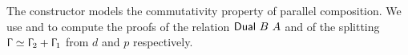 \begin{AgdaAlign}
The constructor  models the commutativity
property of parallel composition. We use  and
 to compute the proofs of the relation
$\AgdaDatatype{Dual}~B~A$ and of the splitting $\Upgamma \simeq \Upgamma_2 +
\Upgamma_1$ from $d$ and $p$ respectively.

\begin{code}[hide]%
%
\>[2]\AgdaSpace{}%
\AgdaSymbol{:}\<%
\\
\>[2][@{}l@{\AgdaIndent{0}}]%
\>[4]\AgdaSpace{}%
\AgdaSpace{}%
\AgdaSymbol{\}}\<%
\\
%
\>[4]\AgdaSymbol{(}\AgdaSpace{}%
\AgdaSymbol{:}\AgdaSpace{}%
\AgdaSpace{}%
\AgdaSpace{}%
\AgdaSymbol{)}\AgdaSpace{}%
\AgdaSymbol{(}\AgdaSpace{}%
\AgdaSymbol{:}\AgdaSpace{}%
\AgdaSpace{}%
\AgdaSpace{}%
\AgdaOperator{\AgdaFunction{[}}\AgdaSpace{}%
\AgdaSpace{}%
\AgdaOperator{\AgdaFunction{]}}\AgdaSpace{}%
\AgdaOperator{\AgdaDatatype{+}}\AgdaSpace{}%
\AgdaOperator{\AgdaFunction{[}}\AgdaSpace{}%
\AgdaSpace{}%
\AgdaOperator{\AgdaFunction{]}}\AgdaSymbol{)}\AgdaSpace{}%
\<%
\\
%
\>[4]\AgdaSpace{}%
\AgdaSpace{}%
\AgdaSpace{}%
\AgdaSpace{}%
\AgdaSpace{}%
\AgdaSymbol{(}\AgdaSpace{}%
\AgdaSymbol{)}\AgdaSpace{}%
\AgdaSymbol{(}\AgdaSpace{}%
\AgdaSymbol{)}\<%
\\
%
\\[\AgdaEmptyExtraSkip]%
%
\>[2]\AgdaSpace{}%
\AgdaSymbol{:}\<%
\\
\>[2][@{}l@{\AgdaIndent{0}}]%
\>[4]\AgdaSpace{}%
\AgdaSpace{}%
\AgdaSpace{}%
\AgdaSpace{}%
\AgdaSpace{}%
\AgdaSpace{}%
\AgdaSymbol{\}}\AgdaSpace{}%
\AgdaSymbol{(}\AgdaSpace{}%
\AgdaSymbol{:}\AgdaSpace{}%
\AgdaSpace{}%
\AgdaSpace{}%
\AgdaSymbol{)}\<%
\\
%
\>[4]\AgdaSymbol{(}\AgdaSpace{}%
\AgdaSymbol{:}\AgdaSpace{}%
\AgdaSpace{}%
\AgdaSpace{}%
\AgdaSpace{}%

\end{code}
\end{AgdaAlign}
